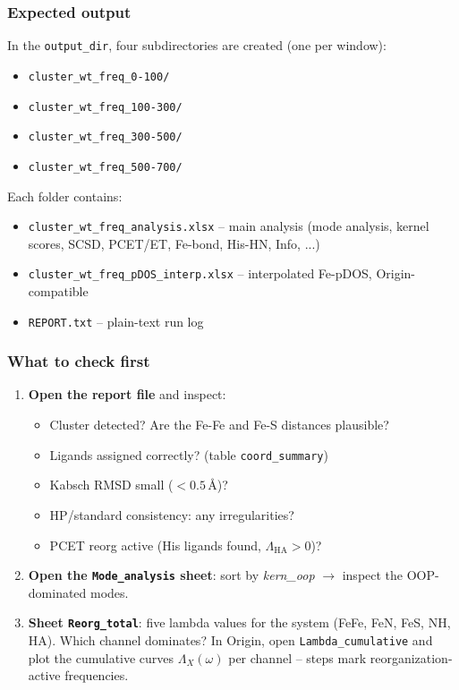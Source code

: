 \documentclass[11pt,a4paper,twoside]{article}
\theoremstyle{remark}
\begin{document}
\subsubsection*{Expected output}

In the \texttt{output\_dir}, four subdirectories are created (one
per window):

\begin{itemize}
  \item \texttt{cluster\_wt\_freq\_0-100/}
  \item \texttt{cluster\_wt\_freq\_100-300/}
  \item \texttt{cluster\_wt\_freq\_300-500/}
  \item \texttt{cluster\_wt\_freq\_500-700/}
\end{itemize}

Each folder contains:

\begin{itemize}
  \item \texttt{cluster\_wt\_freq\_analysis.xlsx} -- main analysis
        (mode analysis, kernel scores, SCSD, PCET/ET, Fe-bond,
        His-HN, Info, ...)
  \item \texttt{cluster\_wt\_freq\_pDOS\_interp.xlsx} -- interpolated
        Fe-pDOS, Origin-compatible
  \item \texttt{REPORT.txt} -- plain-text run log
\end{itemize}

\subsubsection*{What to check first}

\begin{enumerate}
  \item \textbf{Open the report file} and inspect:
    \begin{itemize}
      \item Cluster detected? Are the Fe-Fe and Fe-S distances
            plausible?
      \item Ligands assigned correctly?
            (table \texttt{coord\_summary})
      \item Kabsch RMSD small ($< 0.5$\,\AA{})?
      \item HP/standard consistency: any irregularities?
      \item PCET reorg active (His ligands found,
            $\Lambda_\text{HA} > 0$)?
    \end{itemize}
  \item \textbf{Open the \texttt{Mode\_analysis} sheet}: sort by
        \emph{kern\_oop} $\to$ inspect the OOP-dominated modes.
  \item \textbf{Sheet \texttt{Reorg\_total}}: five lambda values
        for the system (FeFe, FeN, FeS, NH, HA). Which channel
        dominates? In Origin, open \texttt{Lambda\_cumulative}
        and plot the cumulative curves $\Lambda_X(\omega)$ per
        channel -- steps mark reorganization-active frequencies.
\end{enumerate}
\end{document}
